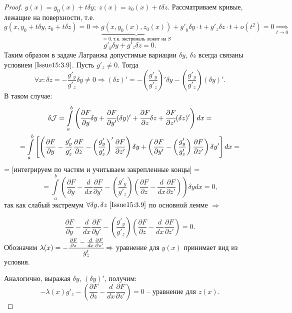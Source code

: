 \begin{proof}
$y(x)=y_0(x)+t\delta y;\;z(x)=z_0(x)+t \delta z.$ Рассматриваем кривые, лежащие на поверхности, т.е. $g(x,y_0+t\delta y,z_0+t \delta z)=0\Rightarrow \underbrace{g(x,y_0(x), z_0(x))}_{=0, \text{т.к. экстремаль лежит на } S}+g'_y\delta y \cdot t + g'_z\delta z \cdot t +o(t^2)=0 \underset{t \rightarrow 0}{\Rightarrow} $
\begin{equation}
    \label{Issue15:3.9}
    g'_y\delta y + g'_z\delta z = 0.
\end{equation}
Таким образом в задаче Лагранжа допустимые вариации $\delta y$, $\delta z$ всегда связаны условием $\eqref{Issue15:3.9}$. Пусть $g'_z\neq 0$. Тогда $$\forall x: \delta z = -\frac{g'_y}{g'_z}\delta y\neq 0\Rightarrow (\delta z)'= -\left(\frac{g'_y}{g'_z}\right)'\delta y - \left(\frac{g'_y}{g'_z}\right)(\delta y)'.$$
В таком случае:
\begin{multline*}
    \delta \mathcal{J}=\int\limits_a^b \left( \cfrac{\partial F}{\partial y}\delta y + \cfrac{\partial F}{\partial y'}(\delta y)' + \cfrac{\partial F}{\partial z}\delta z + \cfrac{\partial F}{\partial z'}(\delta z)' \right)d x = \\ 
    = \int\limits_a^b \left[\left(\frac{\partial F}{\partial y}-\frac{g'_y}{g'_z}\frac{\partial F}{\partial z}-\left(\frac{g'_y}{g'_z}\right)'\frac{\partial F}{\partial z'}\right)\delta y + \left(\frac{\partial F}{\partial y'}- \left(\frac{g'_y}{g'_z}\right)\frac{\partial F}{\partial z'}\right)\delta y'\right]d x = 
\end{multline*}
= [интегрируем по частям и учитываем закрепленные концы] = 
\[ 
    =\int\limits_a^b\left(\frac{\partial F}{\partial y}-\frac{d}{d x}\frac{\partial F}{\partial y'}-\left(\frac{g'_y}{g'_z}\right)\left(\frac{\partial F}{\partial z}-\frac{d}{d x}\frac{\partial F}{\partial z'}\right) \right)\delta y d x = 0,
\]
так как слабый экстремум $\forall \delta y, \delta z ~\eqref{Issue15:3.9}$ по основной лемме $\Rightarrow$

$$ \frac{\partial F}{\partial y} - \frac{d}{d x}\frac{\partial F}{\partial y'} - \left(\frac{g'_y}{g'_z}\right)\left(\frac{\partial F}{\partial z}-\frac{d}{d x}\frac{\partial F}{\partial z'}\right)=0.$$
Обозначим $\lambda (x) = -\cfrac{\frac{\partial F}{\partial z}-\frac{d}{d x}\frac{\partial F}{\partial z'}}{g'_z}\Rightarrow$ уравнение для $y(x)$ принимает вид из условия.

Аналогично, выражая $\delta y$, $(\delta y)'$, получим: 
$$-\lambda (x) g'_z-\left(\frac{\partial F}{\partial z}- \frac{d}{d x}\frac{\partial F}{\partial z'}\right)=0  \text{ -- уравнение для $z(x)$.}$$
\end{proof}